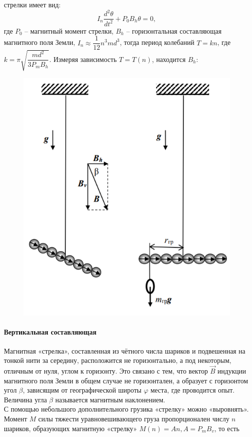 стрелки имеет вид:
$$
I_n \dfrac{d^2 \theta}{dt^2} + P_0 B_h \theta = 0,
$$ 
где $P_0$ -- магнитный момент стрелки, $B_h$ -- горизонтальная составляющая магнитного поля Земли, $I_n \approx \dfrac{1}{12}n^3 m d^3$, тогда период колебаний $T = kn$, где $k = \pi \sqrt{\dfrac{md^2}{3P_m B_h}}$. Измеряя зависимость $T=T(n)$, находится $B_h$:
\begin{center}
\end{center}
\begin{figure}
\includegraphics[scale=0.5]{2.png}
\end{figure} 
\paragraph*{Вертикальная составляющая} 
Магнитная «стрелка», составленная из чётного числа
шариков и подвешенная на тонкой нити за середину, расположится не горизонтально, а под некоторым, отличным от нуля, углом к горизонту. Это связано с тем, что вектор $\vec{B}$ индукции магнитного поля Земли в общем случае не горизонтален, а образует с горизонтом
угол $\beta$, зависящим от географической широты $\varphi$
места, где проводится опыт. Величина угла $\beta$
называется магнитным наклонением.\\
С помощью небольшого дополнительного грузика «стрелку» можно «выровнять». Момент $M$ силы тяжести уравновешивающего груза пропорционален числу $n$ шариков, образующих магнитную «стрелку» $M(n) = An, A=P_m B_v$, то есть
\begin{center}
\end{center}
\newpage
